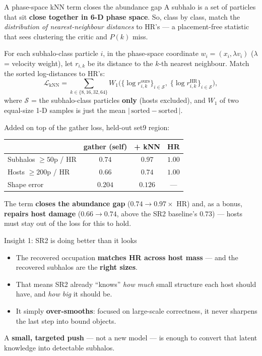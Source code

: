 \documentclass[aspectratio=169]{beamer}
\begin{document}
\begin{frame}{A phase-space kNN term closes the abundance gap}
\small
A subhalo is a set of particles that sit \textbf{close together in 6-D phase
space}. So, class by class, match the \emph{distribution of nearest-neighbour
distances} to HR's --- a placement-free statistic that sees clustering the
critic and $P(k)$ miss.
\vspace{0.15cm}

For each subhalo-class particle $i$, in the phase-space coordinate
$w_i=(x_i,\lambda v_i)$ ($\lambda$ = velocity weight), let $r_{i,k}$ be its
distance to the $k$-th nearest neighbour. Match the sorted log-distances to
HR's:
\[
\mathcal{L}_{\mathrm{kNN}}
=\sum_{k\in\{8,16,32,64\}}
W_1\!\Big(\big\{\log r^{\text{ours}}_{i,k}\big\}_{i\in\mathcal S},\;
          \big\{\log r^{\mathrm{HR}}_{i,k}\big\}_{i\in\mathcal S}\Big),
\]
where $\mathcal S$ = the subhalo-class particles \textbf{only} (hosts excluded),
and $W_1$ of two equal-size 1-D samples is just the mean
$|\,\text{sorted}-\text{sorted}\,|$.
\vspace{0.15cm}

Added on top of the gather loss, held-out set9 region:

\centering
\begin{tabular}{l c c c}
\hline
 & gather (self) & \textbf{+ kNN} & HR \\
\hline
Subhalos $\ge50$p / HR & $0.74$ & $\mathbf{0.97}$ & $1.00$ \\
Hosts $\ge200$p / HR   & $0.66$ & $\mathbf{0.74}$ & $1.00$ \\
Shape error            & $0.204$ & $\mathbf{0.126}$ & --- \\
\hline
\end{tabular}

\vspace{0.2cm}
{\footnotesize The term \textbf{closes the abundance gap} ($0.74\to0.97\times$
HR) and, as a bonus, \textbf{repairs host damage} ($0.66\to0.74$, above the SR2
baseline's $0.73$) --- hosts must stay out of the loss for this to hold.}
\end{frame}

\begin{frame}{Insight 1: SR2 is doing better than it looks}
\small
\begin{itemize}
    \item The recovered occupation \textbf{matches HR across host mass} --- and
          the recovered subhalos are the \textbf{right sizes}.
    \item That means SR2 already ``knows'' \emph{how much} small structure each
          host should have, and \emph{how big} it should be.
    \item It simply \textbf{over-smooths}: focused on large-scale correctness,
          it never sharpens the last step into bound objects.
\end{itemize}
\vspace{0.2cm}
\begin{block}{}
A \textbf{small, targeted push} --- not a new model --- is enough to convert that
latent knowledge into detectable subhalos.
\end{block}
\end{frame}
\end{document}
